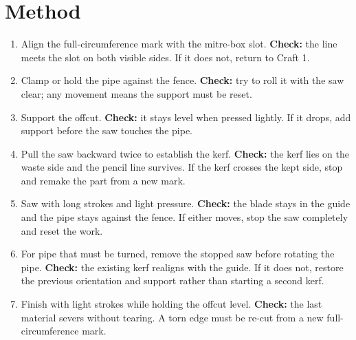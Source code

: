 \hfill
\begin{minipage}[t]{0.50\linewidth}
\vspace{0pt}
\begin{telosfacts}[0.22]
\end{telosfacts}
\end{minipage}

\section{Method}
\begin{enumerate}
\item Align the full-circumference mark with the mitre-box slot. \textbf{Check:}
the line meets the slot on both visible sides. If it does not, return to Craft 1.
\item Clamp or hold the pipe against the fence. \textbf{Check:} try to roll it
with the saw clear; any movement means the support must be reset.
\item Support the offcut. \textbf{Check:} it stays level when pressed lightly.
If it drops, add support before the saw touches the pipe.
\item Pull the saw backward twice to establish the kerf. \textbf{Check:} the
kerf lies on the waste side and the pencil line survives. If the kerf crosses
the kept side, stop and remake the part from a new mark.
\item Saw with long strokes and light pressure. \textbf{Check:} the blade stays
in the guide and the pipe stays against the fence. If either moves, stop the
saw completely and reset the work.
\item For pipe that must be turned, remove the stopped saw before rotating the
pipe. \textbf{Check:} the existing kerf realigns with the guide. If it does not,
restore the previous orientation and support rather than starting a second kerf.
\item Finish with light strokes while holding the offcut level. \textbf{Check:}
the last material severs without tearing. A torn edge must be re-cut from a new
full-circumference mark.
\end{enumerate}

